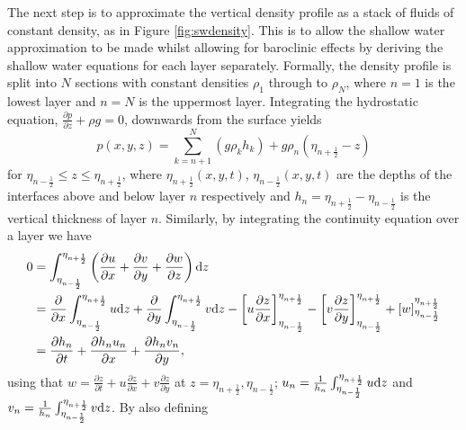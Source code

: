 \documentclass[10pt,a4paper]{article}
\begin{document}
    The next step is to approximate the vertical density profile as a stack of
    fluids of constant density, as in Figure \ref{fig:swdensity}. 
    This is to allow the shallow
    water approximation to be made whilst allowing for baroclinic effects by 
    deriving the shallow water equations for each layer separately. Formally, 
    the density profile is split into $N$ sections with constant densities 
    $\rho_{1}$ through to $\rho_{N}$, where $n=1$ is the lowest layer and $n=N$
    is the uppermost layer. Integrating the hydrostatic equation, $\frac{\partial p}{\partial z} + \rho g=0$,
    downwards from the surface yields 
    \begin{equation}
    p(x,y,z)=\sum^{N}_{k=n+1}\left(g \rho_{k} h_{k} \right) + g \rho_{n}\left(\eta_{n+\frac{1}{2}} - z \right)
    \end{equation}
    for $\eta_{n-\frac{1}{2}}\leq z \leq \eta_{n+\frac{1}{2}}$, where $\eta_{n+\frac{1}{2}}(x,y,t)$,
    $\eta_{n-\frac{1}{2}}(x,y,t)$ are the depths of the interfaces above and below layer $n$
    respectively and $h_{n} = \eta_{n+\frac{1}{2}} -\eta_{n-\frac{1}{2}}$ is the vertical
     thickness  of layer $n$. Similarly, by integrating the continuity equation over a layer
     we have
     \begin{equation}
     \begin{split}
     0 &=\int^{\eta_{n+\frac{1}{2}}}_{\eta_{n-\frac{1}{2}}}\left(\frac{\partial u}{\partial x} + \frac{\partial v}{\partial y} +\frac{\partial w}{\partial z} \right){\rm d} z \\
     &=\frac{\partial }{\partial x}\int^{\eta_{n+\frac{1}{2}}}_{\eta_{n-\frac{1}{2}}} u{\rm d} z +
     \frac{\partial }{\partial y}\int^{\eta_{n+\frac{1}{2}}}_{\eta_{n-\frac{1}{2}}} v{\rm d} z
      -  \left[ u   \frac{\partial z}{\partial x} \right]^{\eta_{n+\frac{1}{2}}}_{\eta_{n-\frac{1}{2}}} 
      -  \left[ v  \frac{\partial z}{\partial y}\right]^{\eta_{n+\frac{1}{2}}}_{\eta_{n-\frac{1}{2}}}  +
      \left[ w \right]^{\eta_{n+\frac{1}{2}}}_{\eta_{n-\frac{1}{2}}} \\
     &=\frac{\partial h_{n} }{\partial t} +\frac{\partial h_{n} u_{n}}{\partial x}+
     \frac{\partial h_{n} v_{n} }{\partial y},      \\
     \end{split}
     \end{equation}
   using that $w =  \frac{\partial z }{\partial t} + u \frac{\partial z}{\partial x} 
   + v \frac{\partial z}{\partial y}$ at $z = \eta_{n+\frac{1}{2}} , \eta_{n-\frac{1}{2}}$; $u_{n} =\frac{1}{h_{n}}\int^{\eta_{n+\frac{1}{2}}}_{\eta_{n-\frac{1}{2}}} u{\rm d} z$ and $v_{n} =\frac{1}{h_{n}}\int^{\eta_{n+\frac{1}{2}}}_{\eta_{n-\frac{1}{2}}} v{\rm d} z$. By also defining 
\end{document}
